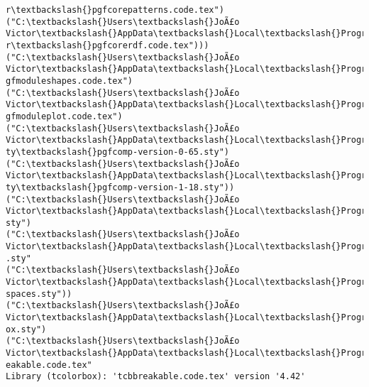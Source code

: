 \documentclass[11pt]{article}
\begin{document}
\begin{Verbatim}[commandchars=\\\{\}]
r\textbackslash{}pgfcorepatterns.code.tex")
("C:\textbackslash{}Users\textbackslash{}JoÃ£o Victor\textbackslash{}AppData\textbackslash{}Local\textbackslash{}Programs\textbackslash{}MiKTeX\textbackslash{}tex/generic/pgf/basiclaye
r\textbackslash{}pgfcorerdf.code.tex")))
("C:\textbackslash{}Users\textbackslash{}JoÃ£o Victor\textbackslash{}AppData\textbackslash{}Local\textbackslash{}Programs\textbackslash{}MiKTeX\textbackslash{}tex/generic/pgf/modules\textbackslash{}p
gfmoduleshapes.code.tex")
("C:\textbackslash{}Users\textbackslash{}JoÃ£o Victor\textbackslash{}AppData\textbackslash{}Local\textbackslash{}Programs\textbackslash{}MiKTeX\textbackslash{}tex/generic/pgf/modules\textbackslash{}p
gfmoduleplot.code.tex")
("C:\textbackslash{}Users\textbackslash{}JoÃ£o Victor\textbackslash{}AppData\textbackslash{}Local\textbackslash{}Programs\textbackslash{}MiKTeX\textbackslash{}tex/latex/pgf/compatibili
ty\textbackslash{}pgfcomp-version-0-65.sty")
("C:\textbackslash{}Users\textbackslash{}JoÃ£o Victor\textbackslash{}AppData\textbackslash{}Local\textbackslash{}Programs\textbackslash{}MiKTeX\textbackslash{}tex/latex/pgf/compatibili
ty\textbackslash{}pgfcomp-version-1-18.sty"))
("C:\textbackslash{}Users\textbackslash{}JoÃ£o Victor\textbackslash{}AppData\textbackslash{}Local\textbackslash{}Programs\textbackslash{}MiKTeX\textbackslash{}tex/latex/tools\textbackslash{}verbatim.
sty")
("C:\textbackslash{}Users\textbackslash{}JoÃ£o Victor\textbackslash{}AppData\textbackslash{}Local\textbackslash{}Programs\textbackslash{}MiKTeX\textbackslash{}tex/latex/environ\textbackslash{}environ
.sty"
("C:\textbackslash{}Users\textbackslash{}JoÃ£o Victor\textbackslash{}AppData\textbackslash{}Local\textbackslash{}Programs\textbackslash{}MiKTeX\textbackslash{}tex/latex/trimspaces\textbackslash{}trim
spaces.sty"))
("C:\textbackslash{}Users\textbackslash{}JoÃ£o Victor\textbackslash{}AppData\textbackslash{}Local\textbackslash{}Programs\textbackslash{}MiKTeX\textbackslash{}tex/latex/etoolbox\textbackslash{}etoolb
ox.sty")
("C:\textbackslash{}Users\textbackslash{}JoÃ£o Victor\textbackslash{}AppData\textbackslash{}Local\textbackslash{}Programs\textbackslash{}MiKTeX\textbackslash{}tex/latex/tcolorbox\textbackslash{}tcbbr
eakable.code.tex"
Library (tcolorbox): 'tcbbreakable.code.tex' version '4.42'


\end{Verbatim}
\end{document}
